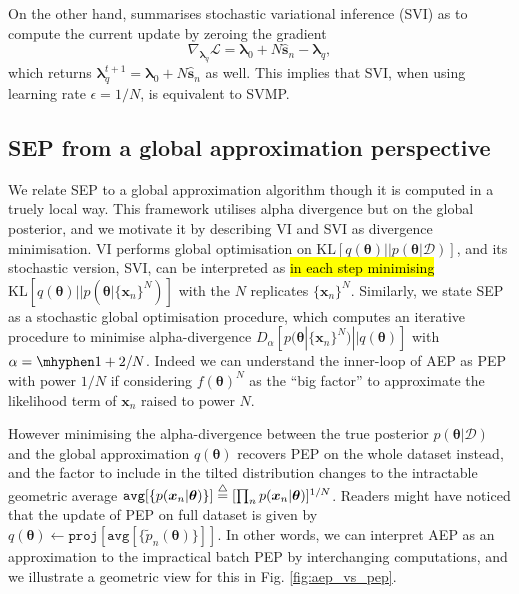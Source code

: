 \documentclass{article} %
\begin{document}
On the other hand, \cite{mandt:smoothedSVI} summarises stochastic variational inference (SVI) as to compute the current update by zeroing the gradient
\begin{equation}
\nabla_{\bm{\lambda}_q} \mathcal{L} = \bm{\lambda}_0 + N \hat{\bm{s}}_n - \bm{\lambda}_q,
\end{equation}
which returns $\bm{\lambda}_q^{t+1} = \bm{\lambda}_0 + N \hat{\bm{s}}_n$ as well. This implies that SVI, when using learning rate $\epsilon = 1/N$, is equivalent to SVMP. 


%
\subsection{SEP from a global approximation perspective}
We relate SEP to a global approximation algorithm though it is computed in a truely local way. This framework utilises alpha divergence but on the global posterior, and we motivate it by describing VI and SVI as divergence minimisation.
%
VI performs global optimisation on $\mathrm{KL}[q(\bm{\theta})||p(\bm{\theta}|\mathcal{D})]$, and its stochastic version, SVI, can be interpreted as \hl{in each step minimising} $\mathrm{KL}[q(\bm{\theta}) || p(\bm{\theta} | \{\bm{x}_n\}^N)]$ with the $N$ replicates $\{\bm{x}_n\}^N$. Similarly, we state SEP as a stochastic global optimisation procedure, which computes an iterative procedure to minimise alpha-divergence $D_{\alpha}[p(\bm{\theta} | \{\bm{x}_n\}^N) || q(\bm{\theta})]$ with $\alpha = \mhyphen 1 + 2/N$. Indeed we can understand the inner-loop of AEP as PEP with power $1/N$ if considering $f(\bm{\theta})^N$ as the ``big factor'' to approximate the likelihood term of $\bm{x}_n$ raised to power $N$.

However minimising the alpha-divergence between the true posterior $p(\bm{\theta}|\mathcal{D})$ and the global approximation $q(\bm{\theta})$ recovers PEP on the whole dataset instead, and the factor to include in the tilted distribution changes to the intractable geometric average $\mathtt{avg}[\{p(\bm{x}_n | \bm{\theta}) \}] \buildrel\triangle\over = [\prod_n p(\bm{x}_n | \bm{\theta}) ]^{1/N} $. Readers might have noticed that the update of PEP on full dataset is given by $q(\bm{\theta}) \leftarrow \mathtt{proj}[\mathtt{avg}[\{ \tilde{p}_n(\bm{\theta}) \}]]$. In other words, we can interpret AEP as an approximation to the impractical batch PEP by interchanging computations, and we illustrate a geometric view for this in Fig. \ref{fig:aep_vs_pep}.
\end{document}
